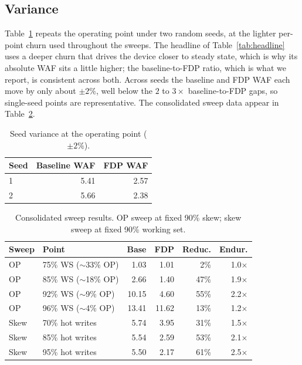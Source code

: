 \documentclass[conference,10pt]{IEEEtran}
\begin{document}
\subsection{Variance}
Table~\ref{tab:var} repeats the operating point under two random seeds, at the
lighter per-point churn used throughout the sweeps. The headline of
Table~\ref{tab:headline} uses a deeper churn that drives the device closer to
steady state, which is why its absolute WAF sits a little higher; the
baseline-to-FDP ratio, which is what we report, is consistent across both. Across
seeds the baseline and FDP WAF each move by only about $\pm2\%$, well below the
$2$ to $3\times$ baseline-to-FDP gaps, so single-seed points are representative.
The consolidated sweep data appear in Table~\ref{tab:sweep}.

\begin{table}[t]
\centering
\caption{Seed variance at the operating point ($\pm2\%$).}
\label{tab:var}
\footnotesize
\begin{tabular}{lrr}
\toprule
Seed & Baseline WAF & FDP WAF \\
\midrule
1 & 5.41 & 2.57 \\
2 & 5.66 & 2.38 \\
\bottomrule
\end{tabular}
\end{table}

\begin{table}[t]
\centering
\caption{Consolidated sweep results. OP sweep at fixed 90\% skew; skew sweep at
fixed 90\% working set.}
\label{tab:sweep}
\footnotesize
\begin{tabular}{llrrrr}
\toprule
Sweep & Point & Base & FDP & Reduc. & Endur. \\
\midrule
OP   & 75\% WS ($\sim$33\% OP) & 1.03  & 1.01  & 2\%  & 1.0$\times$ \\
OP   & 85\% WS ($\sim$18\% OP) & 2.66  & 1.40  & 47\% & 1.9$\times$ \\
OP   & 92\% WS ($\sim$9\% OP)  & 10.15 & 4.60  & 55\% & 2.2$\times$ \\
OP   & 96\% WS ($\sim$4\% OP)  & 13.41 & 11.62 & 13\% & 1.2$\times$ \\
\midrule
Skew & 70\% hot writes & 5.74 & 3.95 & 31\% & 1.5$\times$ \\
Skew & 85\% hot writes & 5.54 & 2.59 & 53\% & 2.1$\times$ \\
Skew & 95\% hot writes & 5.50 & 2.17 & 61\% & 2.5$\times$ \\
\bottomrule
\end{tabular}
\end{table}
\end{document}

